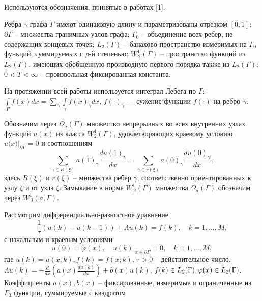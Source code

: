 \vzmscaption


Используются  обозначения, принятые в работах [1].

Ребра $ \gamma $ графа $ \Gamma $ имеют одинаковую длину и параметризованы отрезком $[0,1]$; $ \partial \Gamma  $ -- множества граничных  узлов графа; $ {{\Gamma }_{0}} $ -- объединение всех ребер, не содержащих концевых точек; $L_{2}(\Gamma)$ -- банахово пространство измеримых на $\Gamma_0$ функций, суммируемых с $p$-й степенью; $W_{\,2}^{1}(\Gamma)$ -- пространство функций из $L_{2}(\Gamma)$, имеющих обобщенную производную первого порядка также из $L_{2}(\Gamma)$; $ 0<T<\infty $ -- произвольная фиксированная константа.

На протяжении всей работы используется интеграл Лебега по $\Gamma$: $\int\limits_{\Gamma}f(x)dx=\sum\limits_{\gamma}\int\limits_{\gamma}f(x)_\gamma dx$, $f(\cdot)_\gamma$ --- сужение функции $f(\cdot)$ на ребро $\gamma$.

Обозначим через  $ {{\Omega }_{a}}(\Gamma ) $ множество непрерывных во всех внутренних узлах функций $ u(x) $ из класса $ W_{2}^{1}(\Gamma ) $, удовлетворяющих краевому условию $ u(x{{)|}_{\partial \Gamma }}=0 $ и соотношениям  
\begin{equation*}{
\sum\limits_{\gamma \in R(\xi )}{}a{{(1)}_{\gamma }}\frac{du{{(1)}_{\gamma }}}{dx}=\sum\limits_{\gamma \in r(\xi )}{}a{{(0)}_{\gamma }}\frac{du{{(0)}_{\gamma }}}{dx},}
\end{equation*}
здесь $R(\xi)$ и $r(\xi)$ -- множества ребер $\gamma$, соответственно ориентированных к узлу $\xi$ и от узла $\xi$. Замыкание в норме $W^1_{\,2}(\Gamma)$ множества $\Omega_a(\Gamma)$  обозначим через  $W^1_{\,0}(a,\Gamma)$.

Рассмотрим дифференциально-разностное уравнение
\begin{equation}{
		\frac{1}{\tau}(u(k)-u(k-1))+\Lambda u(k)=f(k),\quad k=1,\ldots,M,
	}
\end{equation}
с начальным и краевым условиями
\begin{equation}{
		u(0)=\varphi (x),\quad u(k){{|}_{x\in \partial \Gamma }}=0,\quad k=1,\ldots,M, 	
	}
\end{equation}
где $ u(k)=u(x;k), f(k)=f(x;k) $, $ \tau>0 $ -- действительное число, $ \Lambda u(k)=-\frac{d}{dx}\left( a(x)\frac{du(k)}{dx} \right)+b(x)u(k) $, $f(k)\in L_2(\Gamma),\quad \\\varphi (x)\in L_2(\Gamma)$. Коэффициенты  $ a(x),b(x) $ -- фиксированные, измеримые и ограниченные на $ {{\Gamma }_{0}}  $ функции, суммируемые с квадратом
 
